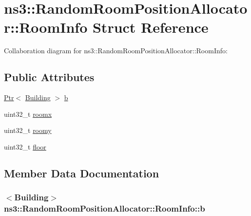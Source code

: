 \hypertarget{structns3_1_1RandomRoomPositionAllocator_1_1RoomInfo}{}\section{ns3\+:\+:Random\+Room\+Position\+Allocator\+:\+:Room\+Info Struct Reference}
\label{structns3_1_1RandomRoomPositionAllocator_1_1RoomInfo}


Collaboration diagram for ns3\+:\+:Random\+Room\+Position\+Allocator\+:\+:Room\+Info\+:
\subsection*{Public Attributes}
\begin{DoxyCompactItemize}
\item 
\hyperlink{classns3_1_1Ptr}{Ptr}$<$ \hyperlink{classns3_1_1Building}{Building} $>$ \hyperlink{structns3_1_1RandomRoomPositionAllocator_1_1RoomInfo_a53a46bd992d7f03e16e8f2071b1f26d9}{b}
\item 
uint32\+\_\+t \hyperlink{structns3_1_1RandomRoomPositionAllocator_1_1RoomInfo_a64a841ca3802c8244f5adcdf335ded92}{roomx}
\item 
uint32\+\_\+t \hyperlink{structns3_1_1RandomRoomPositionAllocator_1_1RoomInfo_adc2a4e7b27cde4f8ee8f548cbdf587f0}{roomy}
\item 
uint32\+\_\+t \hyperlink{structns3_1_1RandomRoomPositionAllocator_1_1RoomInfo_a57a93a9c7c6e9fbda0ff9865a7b13a35}{floor}
\end{DoxyCompactItemize}


\subsection{Member Data Documentation}
\subsubsection[{\texorpdfstring{b}{b}}]{$<${\bf Building}$>$ ns3\+::\+Random\+Room\+Position\+Allocator\+::\+Room\+Info\+::b}\hypertarget{structns3_1_1RandomRoomPositionAllocator_1_1RoomInfo_a53a46bd992d7f03e16e8f2071b1f26d9}{}\label{structns3_1_1RandomRoomPositionAllocator_1_1RoomInfo_a53a46bd992d7f03e16e8f2071b1f26d9}
